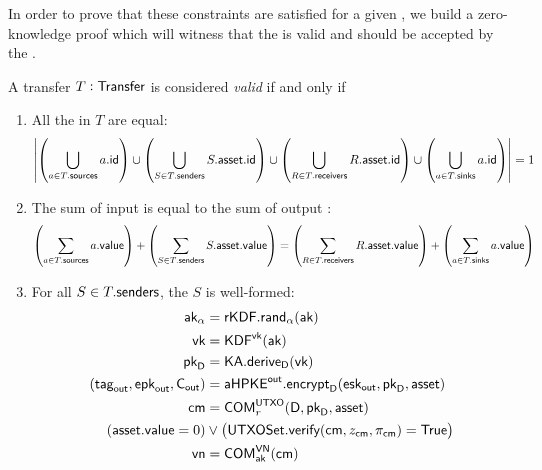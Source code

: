 In order to prove that these constraints are satisfied for a given \Transfer{}, we build a zero-knowledge proof which will witness that the \Transfer{} is valid and should be accepted by the \Ledger{}. 

\begin{definition}\label{def:transfer-validity-statement}
    A transfer $T : {\textsf{Transfer}}$ is considered \emph{valid} if and only if
    \begin{enumerate}
        \item All the  in $T$ are equal:
            \[
                \left|
                    \left(\bigcup_{a \in T.{\textsf{sources}}} a.{\textsf{id}} \right)
                    \cup
                    \left(\bigcup_{S \in T.{\textsf{senders}}} S.{\textsf{asset}}.{\textsf{id}} \right)
                    \cup
                    \left(\bigcup_{R \in T.{\textsf{receivers}}} R.{\textsf{asset}}.{\textsf{id}} \right)
                    \cup
                    \left(\bigcup_{a \in T.{\textsf{sinks}}} a.{\textsf{id}} \right)
                \right| = 1
            \]
        \item The sum of input  is equal to the sum of output :
            \[
                \left(\sum_{a \in T.{\textsf{sources}}} a.{\textsf{value}}\right)
                +
                \left(\sum_{S \in T.{\textsf{senders}}} S.{\textsf{asset}}.{\textsf{value}}\right)
                =
                \left(\sum_{R \in T.{\textsf{receivers}}} R.{\textsf{asset}}.{\textsf{value}}\right)
                +
                \left(\sum_{a \in T.{\textsf{sinks}}} a.{\textsf{value}}\right)
            \]
        \item For all $S \in T.{\textsf{senders}}$, the \Sender{} $S$ is well-formed:
            \begin{align*}
                {\textsf{ak}}_\alpha                            &= {\textsf{rKDF}}.{\textsf{rand}}_\alpha({\textsf{ak}}) \\
                {\textsf{vk}}                                   &= {\textsf{KDF}}^{\textsf{vk}}({\textsf{ak}}) \\
                {{\textsf{pk}}_\textsf{D}}                                  &= {\textsf{KA}}.{\textsf{derive}}_\textsf{D}({\textsf{vk}}) \\
                ({{\textsf{tag}}_{\textsf{out}}}, {{\textsf{epk}}_{\textsf{out}}}, {\textsf{C}_\textsf{out}})             &= {{\textsf{aHPKE}}^\textsf{out}}.{\textsf{encrypt}}_\textsf{D}({{\textsf{esk}}_{\textsf{out}}}, {{\textsf{pk}}_\textsf{D}}, {\textsf{asset}}) \\
                {\textsf{cm}}                                   &= {\textsf{COM}}^{{\textsf{UTXO}}}_{r}(\textsf{D}, {{\textsf{pk}}_\textsf{D}}, {\textsf{asset}}) \\
                \left({\textsf{asset}}.{\textsf{value}} = 0\right) &\vee \left({\textsf{UTXOSet}}.{\textsf{verify}}({\textsf{cm}}, z_{\textsf{cm}}, \pi_{\textsf{cm}}) = {\textsf{True}}\right) \\
                {\textsf{vn}}                                   &= {\textsf{COM}}^{{\textsf{VN}}}_{{\textsf{ak}}}({\textsf{cm}})
            \end{align*}

\end{enumerate}
\end{definition}
